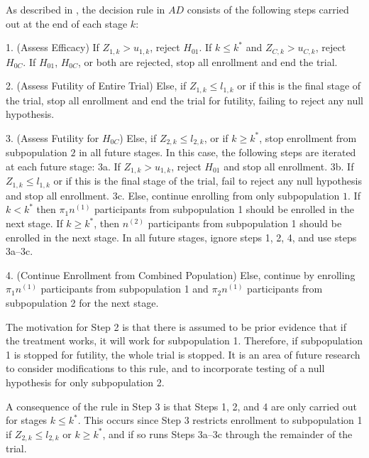 \documentclass[article]{jss}
\begin{document}
As described in \citep{Rosenblum2013AdaptMISTIE}, the decision rule in $AD$ consists of the following steps carried out at the end of each stage $k$:

\begin{description}
\item 1. (Assess Efficacy) 
 If $Z_{1,k}>u_{1,k}$, reject $H_{01}$.
   If $k\leq k^*$ and  $Z_{C,k} > u_{C,k}$, reject $H_{0C}$. 
 If $H_{01}$, $H_{0C}$, or both  are rejected, stop all enrollment and end the trial.
\item 2. (Assess Futility of Entire Trial) Else, if $Z_{1,k} ≤ l_{1,k}$ or if this is the final stage of the trial, stop all enrollment and end the trial for futility, failing to reject  any null hypothesis.
\item 3. (Assess Futility for $H_{0C}$) Else, if $Z_{2,k} ≤ l_{2,k}$, or if $k\geq k^*$, stop enrollment from subpopulation $2$ in all future stages. In this case, the following steps are iterated at each future stage:
	\subitem  3a. If $Z_{1,k} > u_{1,k}$, reject $H_{01}$ and stop all enrollment.
	\subitem  3b. If $Z_{1,k} ≤ l_{1,k}$ or if this is the final stage of the trial, fail to reject any null hypothesis  and stop all enrollment.
	\subitem  3c. Else, continue enrolling from only subpopulation $1$. If $k < k^*$ then $π_1n^{(1)}$ participants from subpopulation 1 should be enrolled in the next stage. If $k \geq k^*$, then $n^{(2)}$ participants from subpopulation 1 should be enrolled in the next stage. In all future stages, ignore steps 1, 2, 4, and use steps 3a--3c.
\item  4. (Continue Enrollment from Combined Population) Else, continue by enrolling $\pi_1 n^{(1)}$ participants from subpopulation 1 and $\pi_2 n^{(1)}$ participants from subpopulation 2 for the next stage.
\end{description}

The motivation for Step 2 is that there is assumed to be prior evidence that if the treatment works, it will work for subpopulation 1. Therefore, if subpopulation 1 is stopped for futility, the whole trial is stopped. It is an area of future research to consider modifications to this rule, and to incorporate testing of a null hypothesis for only subpopulation 2.

A consequence of the rule in Step 3 is that Steps 1, 2, and 4 are only carried out for stages $k\leq k^*$.  This occurs since 
 Step 3 restricts enrollment to subpopulation 1 if $Z_{2,k} ≤ l_{2,k}$ or  $k\geq k^*$, and if so runs Steps 3a--3c through the remainder of the trial.
\end{document}
